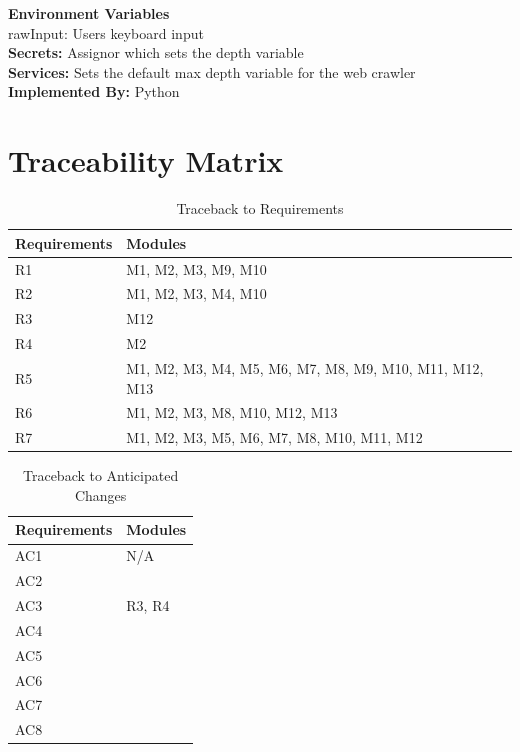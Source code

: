 \documentclass[titlepage]{article}
\begin{document}
\textbf{Environment Variables}\\
rawInput: Users keyboard input\\

\textbf{Secrets:}
Assignor which sets the depth variable\\

\textbf{Services:}
Sets the default max depth variable for the web crawler\\

\textbf{Implemented By:}
Python

\section{Traceability Matrix}
\begin{table}[h!]
\centering
    \begin{tabular}{| p{5cm} | p{5cm} |}    \hline
    Requirements &Modules\\ \hline
    
      R1  &M1, M2, M3, M9, M10 \\ \hline
      R2  &M1, M2, M3, M4, M10 \\ \hline
      R3  &M12 \\ \hline
      R4  &M2 \\ \hline
      R5  &M1, M2, M3, M4, M5, M6, M7, M8, M9, M10, M11, M12, M13 \\ \hline
      R6  &M1, M2, M3, M8, M10, M12, M13 \\ \hline
      R7  &M1, M2, M3, M5, M6, M7, M8, M10, M11, M12 \\ \hline
      
    \end{tabular}
    \caption{Traceback to Requirements}
\label{table:Traceback to Requirements}
\end{table}

\begin{table}[h!]
\centering
    \begin{tabular}{| p{5cm} | p{5cm} |}    \hline
    Requirements &Modules\\ \hline
    
      AC1  & N/A\\ \hline
      AC2  & \\ \hline
      AC3  & R3, R4\\ \hline
      AC4  & \\ \hline
      AC5  & \\ \hline
      AC6  & \\ \hline
      AC7  & \\ \hline
      AC8  & \\ \hline
      
    \end{tabular}
    \caption{Traceback to Anticipated Changes}
\label{table:Traceback to Anticipated Changes}
\end{table}
\end{document}
